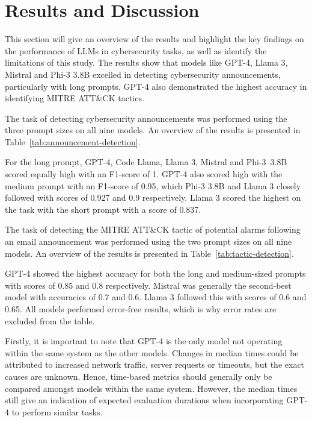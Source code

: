 \section{Results and Discussion}
\label{sec:discussion}

This section will give an overview of the results and highlight the key findings on the performance of LLMs in
cybersecurity tasks, as well as identify the limitations of this study.
The results show that models like GPT-4, Llama 3, Mistral and Phi-3 3.8B excelled in detecting cybersecurity
announcements, particularly with long prompts.
GPT-4 also demonstrated the highest accuracy in identifying MITRE ATT\&CK tactics.

The task of detecting cybersecurity announcements was performed using the three prompt sizes on all nine models.
An overview of the results is presented in Table\ \ref{tab:announcement-detection}.



For the long prompt, GPT-4, Code Llama, Llama 3, Mistral and Phi-3\ 3.8B scored equally high with an F1-score of 1.
GPT-4 also scored high with the medium prompt with an F1-score of 0.95, which Phi-3 3.8B and Llama 3 closely followed
with scores of 0.927 and 0.9 respectively.
Llama 3 scored the highest on the task with the short prompt with a score of 0.837.

The task of detecting the MITRE ATT\&CK tactic of potential alarms following an email announcement was performed using
the two prompt sizes on all nine models.
An overview of the results is presented in Table\ \ref{tab:tactic-detection}.



GPT-4 showed the highest accuracy for both the long and medium-sized prompts with scores of 0.85 and 0.8 respectively.
Mistral was generally the second-best model with accuracies of 0.7 and 0.6.
Llama 3 followed this with scores of 0.6 and 0.65.
All models performed error-free results, which is why error rates are excluded from the table.

Firstly, it is important to note that GPT-4 is the only model not operating within the same system as the other models.
Changes in median times could be attributed to increased network traffic, server requests or timeouts, but the exact
causes are unknown.
Hence, time-based metrics should generally only be compared amongst models within the same system.
However, the median times still give an indication of expected evaluation durations when incorporating GPT-4 to perform
similar tasks.
%

